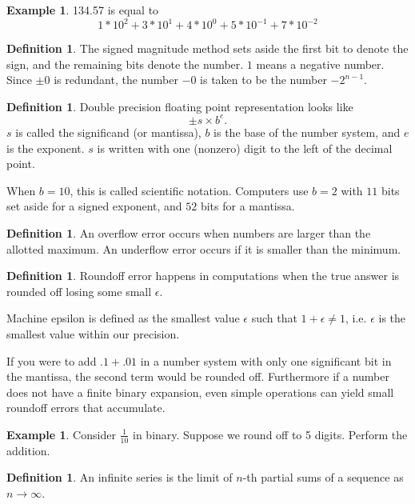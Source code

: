 \documentclass[12pt]{amsart}
\theoremstyle{definition}
\newtheorem{defn}[thm]{Definition}   %
\newtheorem{ex}[thm]{Example}        %
\begin{document}
\begin{ex}
134.57 is equal to
\[ 1 * 10^2 + 3 * 10^1 + 4 * 10^0 + 5 * 10^{-1} + 7 * 10^{-2}\]
\end{ex}

\begin{defn}
The signed magnitude method sets aside the first bit to denote
the sign, and the remaining bits denote the number. $1$ means a 
negative number. Since $\pm 0$ is redundant, the number $-0$ is
taken to be the number $-2^{n-1}$.
\end{defn}

\begin{defn}
Double precision floating point representation looks like
\[\pm s \times b^e. \]
$s$ is called the significand (or mantissa), 
$b$ is the base of the number system,
and $e$ is the exponent. $s$ is written with one (nonzero) digit to the
left of the decimal point.
\end{defn}

When $b = 10$, this is called scientific notation.
Computers use $b = 2$ with $11$ bits set aside for a signed
exponent, and $52$ bits for a mantissa.

\begin{defn}
An overflow error occurs when numbers are larger than the  allotted
maximum. An underflow error occurs if it is smaller than the minimum.
\end{defn}

\begin{defn}
Roundoff error happens in computations when the true answer
is rounded off losing some small $\epsilon$.

Machine epsilon is defined as the smallest value $\epsilon$ such
that $1 + \epsilon \neq 1$, i.e. $\epsilon$ is the smallest value
within our precision.
\end{defn}

If you were to add $.1 + .01$ in a number system with only one significant
bit in the mantissa, the second term would be rounded off.
Furthermore if a number does not have a finite binary expansion,
even simple operations can yield small roundoff errors that accumulate.

\begin{ex}
Consider $\frac{1}{10}$ in binary. Suppose we round off to 5 digits.
Perform the addition.
\end{ex}


\begin{defn}
An infinite series is the limit of $n$-th partial sums of a sequence
as $n \to \infty$.
\end{defn}
\end{document}
